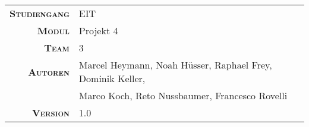 \begin{titlepage}

    \maketitle

    \vspace{50mm}

    \begin{tabular}{r|l}

        \textsc{\textbf{Studiengang}}
        & EIT\\
        [4mm]

        \textsc{\textbf{Modul}}
        & Projekt 4 \\
        [4mm]

        \textsc{\textbf{Team}}
        & 3 \\
        [4mm]

        \textsc{\textbf{Autoren}}
        & Marcel Heymann, Noah H\"usser, Raphael Frey, Dominik Keller,  \\
        & Marco Koch, Reto Nussbaumer, Francesco Rovelli                \\
        [4mm]

        \textsc{\textbf{Version}}
        & 1.0 \\
    \end{tabular}

\end{titlepage}
